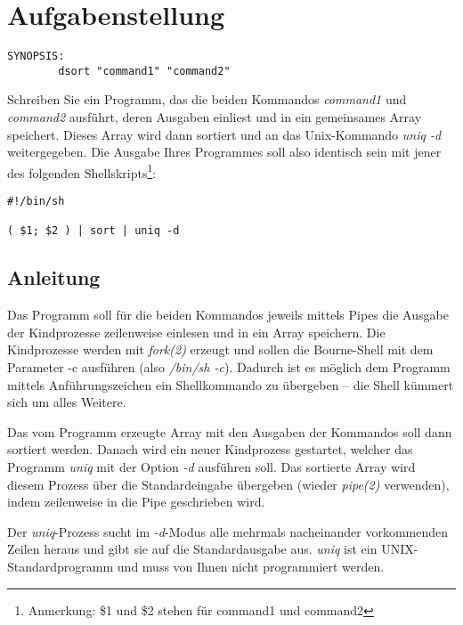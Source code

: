 




\section*{Aufgabenstellung}


\begin{verbatim}
SYNOPSIS:
        dsort "command1" "command2"
\end{verbatim}

Schreiben Sie ein Programm, das die beiden Kommandos \emph{command1}
und \emph{command2} ausführt, deren Ausgaben einliest und in ein
gemeinsames Array speichert. Dieses Array wird dann sortiert und an
das Unix-Kommando \emph{uniq -d} weitergegeben. Die Ausgabe Ihres
Programmes soll also identisch sein mit jener des folgenden
Shellskripts\footnote{Anmerkung: \$1 und \$2 stehen für command1 und
command2}:

\begin{verbatim}
#!/bin/sh

( $1; $2 ) | sort | uniq -d
\end{verbatim}

\subsection*{Anleitung}

Das Programm soll für die beiden Kommandos jeweils mittels Pipes die
Ausgabe der Kindprozesse zeilenweise einlesen und in ein Array
speichern. Die Kindprozesse werden mit \emph{fork(2)} erzeugt und
sollen die Bourne-Shell mit dem Parameter -c ausführen (also
\emph{/bin/sh -c}). Dadurch ist es möglich dem Programm mittels
Anführungszeichen ein Shellkommando zu übergeben – die Shell kümmert
sich um alles Weitere.

Das vom Programm erzeugte Array mit den Ausgaben der Kommandos soll
dann sortiert werden. Danach wird ein neuer Kindprozess gestartet,
welcher das Programm \emph{uniq} mit der Option \emph{-d} ausführen
soll. Das sortierte Array wird diesem Prozess über die Standardeingabe
übergeben (wieder \emph{pipe(2)} verwenden), indem zeilenweise in die
Pipe geschrieben wird.

Der \emph{uniq}-Prozess sucht im \emph{-d}-Modus alle mehrmals
nacheinander vorkommenden Zeilen heraus und gibt sie auf die
Standardausgabe aus. \emph{uniq} ist ein UNIX-Standardprogramm und
muss von Ihnen nicht programmiert werden.

